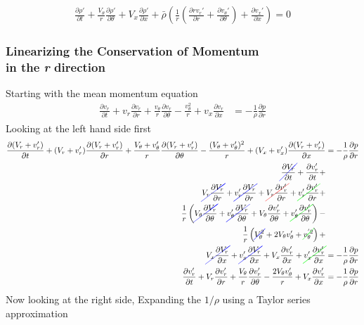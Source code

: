 \begin{align*}
\boxed{
	\frac{\partial \rho'}{\partial t} +
	\frac{V_{\theta}}{r}
	\frac{\partial \rho'}{\partial \theta} + 
	V_x
	\frac{\partial \rho'}{\partial x} +
	\bar{\rho}
	\left(
	\frac{1}{r}
	\left(
	\frac{\partial r v_r'}{\partial r} + \frac{\partial v_{\theta}'}{\partial \theta}		 
	\right) +
	\frac{\partial v_x'}{\partial x}
	\right)= 0} 
\end{align*}
\newpage
\subsubsection{Linearizing the Conservation of Momentum\\ in the \textit{r} direction}
Starting with the mean momentum equation 
\begin{align*}
\frac{\partial v_r}{\partial t} + 
v_r \frac{\partial v_r}{\partial r} +
\frac{v_{\theta}  }{r}
\frac{\partial v_r}{\partial \theta}- \frac{v_{\theta}^2}{r}+ 
v_x \frac{\partial v_r}{\partial x} 
&= -\frac{1}{\rho} 
\frac{\partial p}{\partial r}
\end{align*}
Looking at the left hand side first
\begin{align*} 
\frac{\partial (V_r + v_r') }{\partial t} + 
( V_r + v_r' ) 
\frac{\partial( V_r + v_r')}{\partial r} +
\frac{V_{\theta} + v_{\theta}'}{r}
\frac{\partial(V_r + v_r')}{\partial \theta} -
\frac{ (V_{\theta} + v_{\theta}')^2}{ r} + 
(V_x + v_x') 
\frac{\partial (V_r + v_r')}{\partial x} 	
&= -\frac{1}{\rho} \frac{\partial p}{\partial r}\\
\Ccancel[blue]  {\frac{\partial  V_r  }{\partial t}}	+
\frac{\partial  v_r' }{\partial t} + \\
\Ccancel[blue]  {V_r  \frac{\partial  V_r  }{\partial r}}  +
\Ccancel[blue] {v_r' \frac{\partial  V_r  }{\partial r}} + 
\Ccancel[red] {V_r  \frac{\partial  v_r' }{\partial r}} + 
\Ccancel[green]{v_r' \frac{\partial  v_r' }{\partial r}} +\\
\frac{1}{r}
\left(
\Ccancel[blue]  {V_{\theta} \frac{\partial V_r}{\partial \theta}} +
\Ccancel[blue] {v_{\theta}'\frac{\partial V_r}{\partial \theta}} +
V_{\theta} \frac{\partial v'_r}{\partial \theta} +
\Ccancel[green]{v_{\theta}'\frac{\partial v'_r}{\partial \theta}}
\right)- \\
\frac{1}{r}\left(
\Ccancel[blue]{V_{\theta}^2} + 
2V_{\theta}v'_{\theta} + 	
\Ccancel[green]{v^{'2}_{\theta}}\right)+\\
\Ccancel[blue]{V_x \frac{\partial V_r }{\partial x}} +
\Ccancel[blue]{v_x'\frac{\partial V_r }{\partial x}} +  
V_x \frac{\partial v_r'}{\partial x} +
\Ccancel[green]{v_x' \frac{\partial v_r'}{\partial x}} 
&= -\frac{1}{\rho} 
\frac{\partial p}{\partial r}\\
\frac{\partial  v_r' }{\partial t} +
V_r  \frac{\partial  v_r' }{\partial r} + 
\frac{V_{\theta}}{r} \frac{\partial v'_r}{\partial \theta} -
\frac{2V_{\theta}v'_{\theta}}{r} +
V_x \frac{\partial v_r'}{\partial x} 
&= -\frac{1}{\rho} 
\frac{\partial p}{\partial r}
\end{align*}
\newpage
Now looking at the right side,
Expanding the $1/\rho $ using a Taylor series approximation

